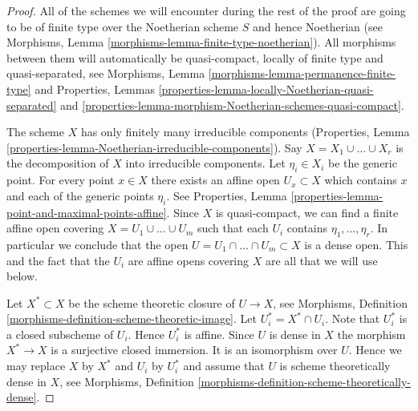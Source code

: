 \documentclass{stacks-project}
\theoremstyle{plain}
\theoremstyle{definition}
\theoremstyle{remark}
\numberwithin{equation}{subsection}
\begin{document}
\begin{proof}
All of the schemes we will encounter during the rest of the proof
are going to be of finite type over the Noetherian scheme $S$ and
hence Noetherian
(see Morphisms, Lemma \ref{morphisms-lemma-finite-type-noetherian}).
All morphisms between them will automatically be quasi-compact, locally of
finite type and quasi-separated, see
Morphisms, Lemma \ref{morphisms-lemma-permanence-finite-type} and
Properties,
Lemmas \ref{properties-lemma-locally-Noetherian-quasi-separated} and
\ref{properties-lemma-morphism-Noetherian-schemes-quasi-compact}.

\medskip\noindent
The scheme $X$ has only finitely many irreducible components
(Properties, Lemma \ref{properties-lemma-Noetherian-irreducible-components}).
Say $X = X_1 \cup \ldots \cup X_r$ is the decomposition
of $X$ into irreducible components.
Let $\eta_i \in X_i$ be the generic point.
For every point $x \in X$ there exists an affine open
$U_x \subset X$ which contains $x$ and each of the generic
points $\eta_i$. See
Properties, Lemma \ref{properties-lemma-point-and-maximal-points-affine}.
Since $X$ is quasi-compact, we can find a finite affine open
covering $X = U_1 \cup \ldots \cup U_m$ such that
each $U_i$ contains $\eta_1, \ldots, \eta_r$.
In particular we conclude that the open
$U = U_1 \cap \ldots \cap U_m \subset X$ is
a dense open. This and the fact that the $U_i$ are affine opens
covering $X$ are all that we will use below.

\medskip\noindent
Let $X^* \subset X$ be the scheme theoretic closure of $U \to X$, see
Morphisms, Definition \ref{morphisms-definition-scheme-theoretic-image}.
Let $U_i^* = X^* \cap U_i$. Note that $U_i^*$ is a closed subscheme
of $U_i$. Hence $U_i^*$ is affine. Since $U$ is dense in $X$ the
morphism $X^* \to X$ is a surjective closed immersion. It is an
isomorphism over $U$. Hence we may replace $X$ by $X^*$ and
$U_i$ by $U_i^*$ and assume that $U$ is scheme theoretically dense
in $X$, see
Morphisms, Definition \ref{morphisms-definition-scheme-theoretically-dense}.


\end{proof}
\end{document}
